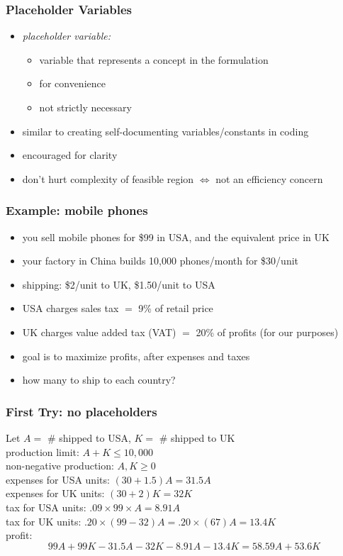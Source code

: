 \documentclass{beamer}
\begin{document}
\begin{frame} \frametitle{Placeholder Variables}
\begin{itemize}
  \item \emph{placeholder variable:}
    \begin{itemize}
      \item variable that represents a concept
        in the formulation
      \item for convenience
      \item not strictly necessary
    \end{itemize}
  \item similar to creating self-documenting variables/constants in coding
  \item encouraged for clarity
  \item don't hurt complexity of feasible region $\Leftrightarrow$ not an efficiency concern
\end{itemize}
\end{frame}

\begin{frame} \frametitle{Example: mobile phones}
  \begin{itemize}
    \item you sell mobile phones for \$99 in USA, and the equivalent price in UK
    \item your factory in China builds 10,000 phones/month for \$30/unit
    \item shipping: \$2/unit to UK, \$1.50/unit to USA
    \item USA charges sales tax $=$ 9\% of retail price
    \item UK charges value added tax (VAT) $=$ 20\% of profits (for our purposes)
    \item goal is to maximize profits, after expenses and taxes
    \item how many to ship to each country?
  \end{itemize}
\end{frame}

\begin{frame} \frametitle{First Try: no placeholders}
Let $A = $ \# shipped to USA, $K = $ \# shipped to UK \\
production limit: $A+K \leq 10,000$ \\
non-negative production: $A, K \geq 0$ \\
expenses for USA units: $(30+1.5)A = 31.5A$ \\
expenses for UK units: $(30+2)K = 32K$ \\
tax for USA units: $.09 \times 99 \times A = 8.91 A$ \\
tax for UK units: $.20 \times (99-32)A = .20 \times (67)A = 13.4 K$ \\
profit:
\[ 99A + 99K - 31.5A - 32K - 8.91A - 13.4K = 58.59A + 53.6K \]
\end{frame}
\end{document}
